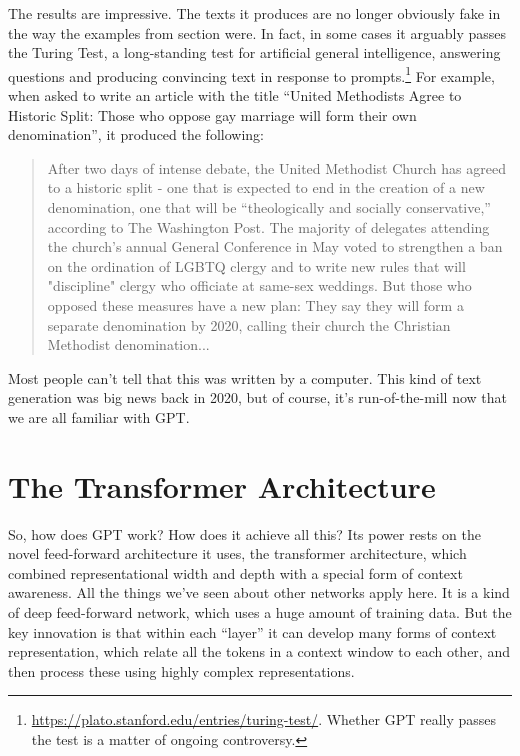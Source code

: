 The results are impressive. The texts it produces are no longer obviously fake in the way the examples from section  were. In fact, in some cases it arguably passes the Turing Test, a long-standing test for artificial general intelligence, answering questions and producing convincing  text in response to prompts.\footnote{\url{https://plato.stanford.edu/entries/turing-test/}. Whether GPT really passes the test is a matter of ongoing controversy.} For example, when asked to write an article with the title ``United Methodists Agree to Historic Split: Those who oppose gay marriage will form their own denomination'', it produced the following:
\begin{quote}
After two days of intense debate, the United Methodist Church has agreed to a historic split - one that is expected to end in the creation of a new denomination, one that will be ``theologically and socially conservative,'' according to The Washington Post. The majority of delegates attending the church's annual General Conference in May voted to strengthen a ban on the ordination of LGBTQ clergy and to write new rules that will "discipline" clergy who officiate at same-sex weddings. But those who opposed these measures have a new plan: They say they will form a separate denomination by 2020, calling their church the Christian Methodist denomination...
\end{quote}
Most people can't tell that this was written by a computer.  This kind of text generation was big news back in 2020, but of course, it's run-of-the-mill now that we are all familiar with GPT.

\section{The Transformer Architecture}\label{transformers}

So, how does GPT work? How does it achieve all this? Its power rests on the novel feed-forward architecture it uses, the transformer architecture, which combined representational width and depth with a special form of context awareness. All the things we've seen about other networks apply here. It is a kind of deep feed-forward network, which uses a huge amount of training data. But the key innovation is that within each ``layer'' it can develop many forms of context representation, which relate all the tokens in a context window to each other, and then process these using highly complex representations.

